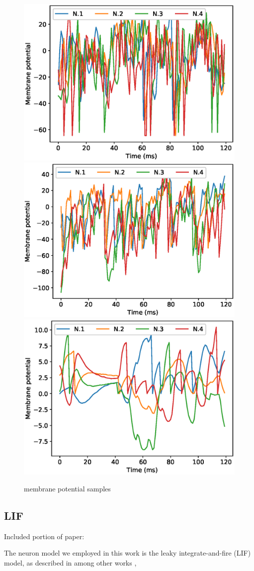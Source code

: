 \documentclass[mphil,deptreport,ianc]{infthesis} %
\begin{document}
\begin{figure}
    \centering
    \vskip -0.1in
    \includegraphics[width=0.49\columnwidth]{figures/samples/membrane_potentials/export_sample_LIF_white_noise.eps}
    \includegraphics[width=0.49\columnwidth]{figures/samples/membrane_potentials/export_sample_GLIF_white_noise.eps}
    \includegraphics[width=0.49\columnwidth]{figures/samples/membrane_potentials/export_sample_mesoGIF_white_noise.eps}
    \vskip -0.1in
    \caption{membrane potential samples}
    \label{fig:membrane_potential_samples}
    \vskip -0.2in
\end{figure}

\subsection{LIF}

Included portion of paper:

The neuron model we employed in this work is the leaky integrate-and-fire (LIF) model, as described in among other works \cite{Rolls1998Book},
\end{document}
